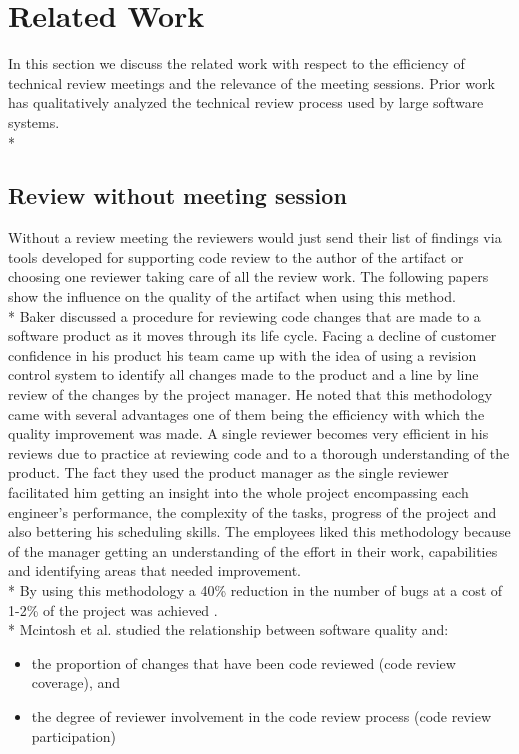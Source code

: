 \section{Related Work}
In this section we discuss the related work with respect to the efficiency of technical review meetings and the relevance of the meeting sessions. Prior work has qualitatively analyzed the technical review process used by large software systems. \\*

\subsection{Review without meeting session}
Without a review meeting the reviewers would just send their list of findings via tools developed for supporting code review to the author of the artifact or choosing one reviewer taking care of all the review work. The following papers show the influence on the quality of the artifact when using this method. \\* 
Baker discussed a procedure for reviewing code changes that are made to a software product as it moves through its life cycle. Facing a decline of customer confidence in his product his team came up with the idea of using a revision control system to identify all changes made to the product and a line by line review of the changes by the project manager. He noted that this methodology came with several advantages one of them being the efficiency with which the quality improvement was made. A single reviewer becomes very efficient in his reviews due to practice at reviewing code and to a thorough understanding of the product. The fact they used the product manager as the single reviewer facilitated him getting an insight into the whole project encompassing each engineer's performance, the complexity of the tasks, progress of the project and also bettering his scheduling skills. The employees liked this methodology because of the manager getting an understanding of the effort in their work, capabilities and identifying areas that needed improvement. \\*
By using this methodology a 40\% reduction in the number of bugs at a cost of 1-2\% of the project was achieved \cite{Baker:1997:CRE:253228.253461}. \\*
Mcintosh et al. studied the relationship between software quality and:
\begin{itemize}
	\item the proportion of changes that have been code reviewed (code review coverage), and
	\item the degree of reviewer involvement in the code review process (code review participation)
\end{itemize}
